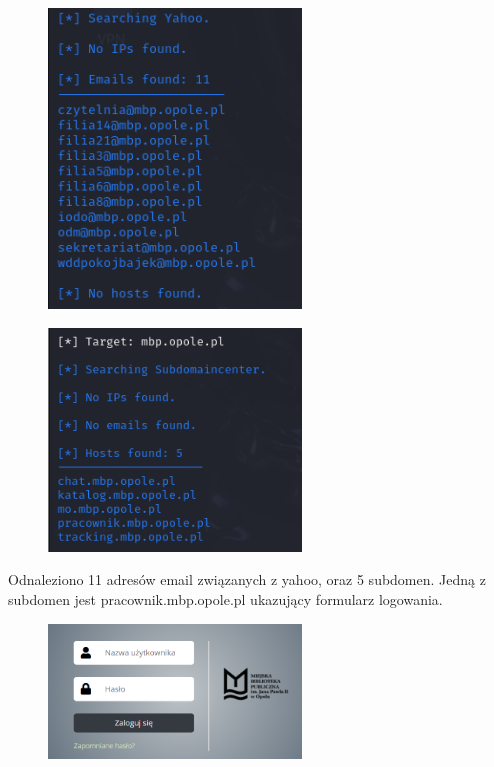 \documentclass{article}
\begin{document}
\begin{figure}[H]
  \centering
  \includegraphics[width=0.6\textwidth]{harvester_yahoo.png}
\end{figure}
\begin{figure}
  \centering
  \includegraphics[width=0.6\textwidth]{harvester_subdomaincenter.png}
\end{figure}
Odnaleziono 11 adresów email związanych z yahoo, oraz 5 subdomen. Jedną z subdomen jest pracownik.mbp.opole.pl ukazujący formularz logowania.
\begin{figure}
  \centering
  \includegraphics[width=0.6\textwidth]{pracownik_mbp.png}
\end{figure}
\end{document}
